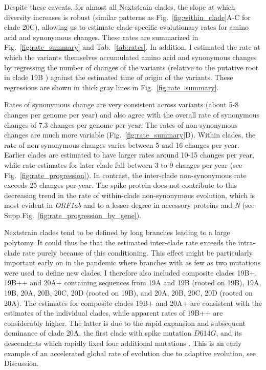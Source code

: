 \documentclass[aps,rmp, twocolumn]{revtex4}
\begin{document}
Despite these caveats, for almost all Nextstrain clades, the slope at which diversity increases is robust (similar patterns as Fig.~\ref{fig:within_clade}A-C for clade 20C), allowing us to estimate clade-specific evolutionary rates for amino acid and synonymous changes.
These rates are summarized in Fig.~\ref{fig:rate_summary} and Tab.~\ref{tab:rates}.
In addition, I estimated the rate at which the variants themselves accumulated amino acid and synonymous changes by regressing the number of changes of the variants (relative to the putative root in clade 19B \citep{caraballo-ortiz_tophap_2022}) against the estimated time of origin of the variants.
These regressions are shown in thick gray lines in Fig.~\ref{fig:rate_summary}.

Rates of synonymous change are very consistent across variants (about 5-8 changes per genome per year) and also agree with the overall rate of synonymous changes of 7.3 changes per genome per year.
The rates of non-synonymous changes are much more variable (Fig.~\ref{fig:rate_summary}D).
Within clades, the rate of non-synonymous changes varies between 5 and 16 changes per year.
Earlier clades are estimated to have larger rates around 10-15 changes per year, while rate estimates for later clade fall  between 3 to 9 changes per year (see Fig.~\ref{fig:rate_progression}).
In contrast, the inter-clade non-synonymous rate exceeds 25 changes per year.
The spike protein does not contribute to this decreasing trend in the rate of within-clade non-synonymous evolution, which is most evident in \emph{ORF1ab} and to a lesser degree in accessory proteins and \emph{N} (see Supp.Fig.~\ref{fig:rate_progression_by_gene}).

Nextstrain clades tend to be defined by long branches leading to a large polytomy.
It could thus be that the estimated inter-clade rate exceeds the intra-clade rate purely because of this conditioning.
This effect might be particularly important early on in the pandemic where branches with as few as two mutations were used to define new clades.
I therefore also included composite clades 19B+, 19B++ and 20A+ containing sequences from 19A and 19B (rooted on 19B), 19A, 19B, 20A, 20B, 20C, 20D (rooted on 19B), and 20A, 20B, 20C, 20D (rooted on 20A).
The estimates for composite clades 19B+ and 20A+ are consistent with the estimates of the individual clades, while apparent rates of 19B++ are considerably higher.
The latter is due to the rapid expansion and subsequent dominance of clade 20A, the first clade with spike mutation $D614G$, and its descendants which rapidly fixed four additional mutations \citep{korber_tracking_2020}.
This is an early example of an accelerated global rate of evolution due to adaptive evolution, see Discussion.
\end{document}
